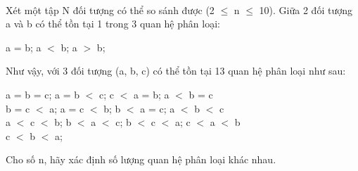  

Xét một tập N đối tượng có thể so sánh được (2 $\le$ n $\le$ 10). Giữa 2 đối tượng a và b có thể tồn tại 1 trong 3 quan hệ phân loại:

a = b; a $<$ b; a $>$ b;

Như vậy, với 3 đối tượng (a, b, c) có thể tồn tại 13 quan hệ phân loại như sau:

a = b = c; a = b $<$ c; c $<$ a = b; a $<$ b = c
\\b = c $<$ a; a = c $<$ b; b $<$ a = c; a $<$ b $<$ c
\\a $<$ c $<$ b; b $<$ a $<$ c; b $<$ c $<$ a; c $<$ a $<$ b
\\c $<$ b $<$ a;

Cho số n, hãy xác định số lượng quan hệ phân loại khác nhau.